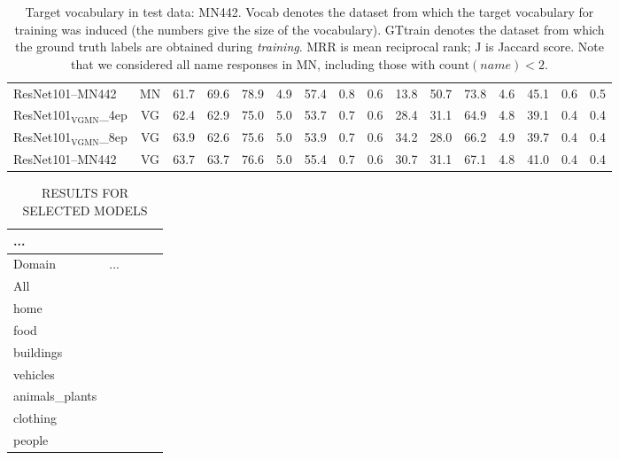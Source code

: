 \begin{table*}[t]
\begin{tabular}{l|c|r@{~}r@{~}r@{~}r@{~}r@{~}r@{~}r|@{~}r@{~}r@{~}r@{~}r@{~}r@{~}r@{~}r@{~}}
		ResNet101--MN442 & MN &            61.7 &              69.6 &                78.9 &         4.9 &             57.4 &          0.8 &             0.6 &            13.8 &              50.7 &                73.8 &         4.6 &             45.1 &          0.6 &             0.5 \\
		ResNet101$_{\text{VGMN}}$\_4ep  &   VG &  62.4 &              62.9 &                75.0 &         5.0 &             53.7 &          0.7 &             0.6 &            28.4 &              31.1 &                64.9 &         4.8 &             39.1 &          0.4 &             0.4 \\
		ResNet101$_{\text{VGMN}}$\_8ep & VG &            63.9 &              62.6 &                75.6 &         5.0 &             53.9 &          0.7 &             0.6 &            34.2 &              28.0 &                66.2 &         4.9 &             39.7 &          0.4 &             0.4 \\
		ResNet101--MN442 & VG  &            63.7 &              63.7 &                76.6 &         5.0 &             55.4 &          0.7 &             0.6 &            30.7 &              31.1 &                67.1 &         4.8 &             41.0 &          0.4 &             0.4 \\
		\bottomrule
	\end{tabular}
	\caption{Target vocabulary in test data: MN442. Vocab denotes the dataset from which the target vocabulary for training was induced (the numbers give the size of the vocabulary). GTtrain denotes the dataset from which the ground truth labels are obtained during \textit{training}. MRR is mean reciprocal rank; J is Jaccard score. Note that we considered all name responses in MN, including those with $\text{count}(name)<2$\label{tab:entrylevels}. }
\end{table*}


\begin{table*}[t]
	\centering
	\small
	\begin{tabular}{l@{~}|rrrr}
		\toprule
		... \\
		\midrule
		Domain	 & ... \\ 
		\midrule
		All           \\
		home           \\
		food           \\
		buildings      \\
		vehicles       \\
		animals\_plants \\
		clothing       \\
		people         \\
		\bottomrule
	\end{tabular}
	\caption{RESULTS FOR SELECTED MODELS \label{tab:domains_bestmodel}}
\end{table*}

